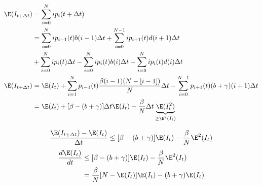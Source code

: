     \begin{frame}{}
        \begin{align*}
            \E(I_{t + \Delta t}) &=  
                \sum_{i = 0} ^ N
                    i p_i(t + \Delta t)
            \\  
                        &=
                    \sum_{i = 0} ^ N
                        i p_{i - 1} (t) b(i - 1) \Delta t
                   + \sum_{i = 0} ^ {N-1}
                        i p_{i + 1} (t) d(i + 1) \Delta t
            \\
                & + \sum_{i=0}^N i p_i(t) \Delta t
                - \sum_{i=0}^N i p_i(t) b(i) \Delta t
                - \sum_{i=0}^N i p_i(t) d(i) \Delta t
            \\
                \E(I_{t+ \Delta t}) 
                &= 
                    \E(I_t) 
                        + \sum_{i = 1} ^ N
                        p_{i-1} (t)
                        \frac{\beta (i-1)(N - [i -1])}{N} \Delta t
                        -\sum_{i = 0} ^ {N - 1}
                        p_{i + 1} (t) (b + \gamma) (i+1) \Delta t
            \\
                &=
                \E(I_t) + [\beta - (b + \gamma )] \Delta t \E(I_t)
                -\frac{\beta}{N} \Delta t \underbrace{\E(I_t ^ 2)}_{\geq \E ^2(I_t)}
            \end{align*}

            \begin{equation*}
                \frac{\E(I_{t + \Delta t}) - \E(I_t)}{\Delta t}
                    \leq
                        [\beta  - (b + \gamma)] \E (I_t)
                        - \frac{\beta}{N} \E^2 (I_t)
            \end{equation*}
            \begin{align*}
                \frac{d \E(I_{t})}{dt}
                    & \leq
                        [\beta  - (b + \gamma)] \E (I_t)
                        - \frac{\beta}{N} \E ^ 2 (I_t)
                \\
                    & = \frac{\beta}{N} [N - \E(I_t)] \E (I_t)
                        - (b + \gamma) \E (I_t)
            \end{align*}        
    \end{frame}